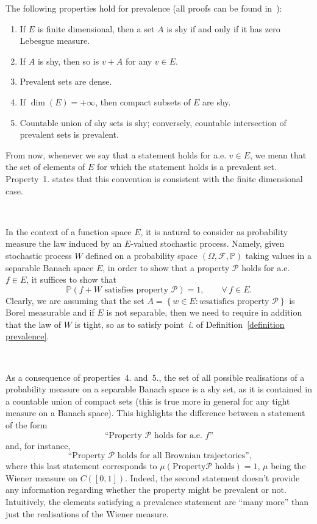\documentclass[10pt]{article}
\newcommand{\tmtextit}[1]{{\itshape{#1}}}
\newenvironment{enumeratenumeric}{\begin{enumerate}[1.] }{\end{enumerate}}
\begin{document}
The following properties hold for prevalence (all proofs can be found
in~{\cite{hunt}}):
\begin{enumeratenumeric}
  \item If $E$ is finite dimensional, then a set $A$ is shy if and only if it
  has zero Lebesgue measure.
  
  \item If $A$ is shy, then so is $v + A$ for any $v \in E$.
  
  \item Prevalent sets are dense.
  
  \item If $\dim (E) = + \infty$, then compact subsets of $E$ are shy.
  
  \item Countable union of shy sets is shy; conversely, countable intersection
  of prevalent sets is prevalent. 
\end{enumeratenumeric}
From now, whenever we say that a statement holds for a.e. $v \in E$, we mean
that the set of elements of $E$ for which the statement holds is a prevalent
set. Property~1. states that this convention is consistent with the finite
dimensional case.

\

In the context of a function space $E$, it is natural to consider as
probability measure the law induced by an $E$\mbox{-}valued stochastic
process. Namely, given stochastic process $W$ defined on a probability space
$(\Omega, \mathcal{F}, \mathbb{P})$ taking values in a separable Banach space
$E$, in order to show that a property $\mathcal{P}$ holds for a.e. $f \in E$,
it suffices to show that
\[ \mathbb{P} \left( \text{$f + W$ satisfies property $\mathcal{P}$} \right) =
   1, \qquad \forall \, f \in E. \]
Clearly, we are assuming that the set $A = \left\{ w \in E : \text{$w$
satisfies property $\mathcal{P}$} \right\}$ is Borel measurable and if $E$ is
not separable, then we need to require in addition that the law of $W$ is
tight, so as to satisfy point~\tmtextit{i.} of Definition~\ref{definition
prevalence}.

\

As a consequence of properties~4. and~5., the set of all possible
realisations of a probability measure on a separable Banach space is a shy
set, as it is contained in a countable union of compact sets (this is true
more in general for any tight measure on a Banach space). This highlights the
difference between a statement of the form
\[ \text{``Property $\mathcal{P}$ holds for a.e. $f$''} \]
and, for instance,
\[ \text{ ``Property $\mathcal{P}$ holds for all Brownian trajectories''}, \]
where this last statement corresponds to $\mu \left( \text{Property
$\mathcal{P}$ holds} \right) = 1$, $\mu$ being the Wiener measure on $C ([0,
1])$. Indeed, the second statement doesn't provide any information regarding
whether the property might be prevalent or not. Intuitively, the elements
satisfying a prevalence statement are ``many more'' than just the realisations
of the Wiener measure.
\end{document}
